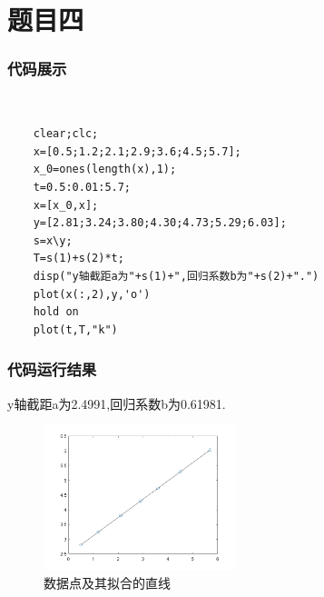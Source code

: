 \documentclass[UTF8,a4paper,10pt]{ctexart}
\begin{document}
\section{题目四}
\subsubsection{代码展示}
~\\
\lstset{language=matlab}
\begin{lstlisting}
    clear;clc;
    x=[0.5;1.2;2.1;2.9;3.6;4.5;5.7];
    x_0=ones(length(x),1);
    t=0.5:0.01:5.7;
    x=[x_0,x];
    y=[2.81;3.24;3.80;4.30;4.73;5.29;6.03];
    s=x\y;
    T=s(1)+s(2)*t;
    disp("y轴截距a为"+s(1)+",回归系数b为"+s(2)+".")
    plot(x(:,2),y,'o')
    hold on
    plot(t,T,"k")
\end{lstlisting}


\subsubsection{代码运行结果}
y轴截距a为2.4991,回归系数b为0.61981.
\begin{figure}[!htbp]
    \centering
    \includegraphics[width=0.5\textwidth,height=0.375\textwidth]{pictures/linearfit.png}
    \caption{数据点及其拟合的直线} \label{linearfit}
\end{figure}
\newline


\end{document}
